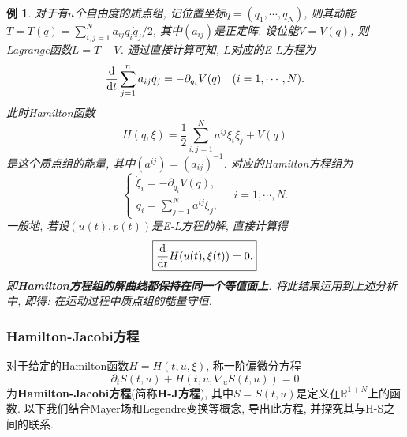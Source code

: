 \documentclass[12pt,a4paper]{article}
\newtheorem{example}[theorem]{例}
\begin{document}
\begin{example}
    对于有$n$个自由度的质点组, 记位置坐标$q = (q_1, \cdots, q_N)$, 则其动能$T = T(q) = \sum_{i, j = 1}^Na_{ij}\dot q_i\dot q_j/2$, 其中$(a_{ij})$是正定阵.
    设位能$V = V(q)$, 则Lagrange函数$L = T - V$. 通过直接计算可知, $L$对应的E-L方程为 
    \begin{equation*}
        \frac{{\rm d}}{{\rm d}t}\sum_{j = 1}^na_{ij}\dot q_j = -\partial_{q_i}V(q) \quad (i = 1, \cdots, N).
    \end{equation*}
    此时Hamilton函数 
    \begin{equation*}
        H(q, \xi) = \frac{1}{2}\sum_{i, j = 1}^Na^{ij}\xi_i\xi_j + V(q)
    \end{equation*}
    是这个质点组的能量, 其中$(a^{ij}) = (a_{ij})^{-1}$. 对应的Hamilton方程组为 
    \begin{equation*}
        \begin{cases} 
            \dot\xi_i = -\partial_{q_i}V(q), \\  
            \dot q_i = \sum_{j = 1}^Na^{ij}\xi_j,  
        \end{cases} 
        \quad i= 1, \cdots, N.
    \end{equation*}
    一般地, 若设$(u(t), p(t))$是E-L方程的解, 直接计算得 
    \begin{equation*}
        \boxed{\frac{{\rm d}}{{\rm d}t}H(u(t), \xi(t)) = 0.}
    \end{equation*}
    即\textbf{Hamilton方程组的解曲线都保持在同一个等值面上}. 将此结果运用到上述分析中, 即得: 在运动过程中质点组的能量守恒.
\end{example}

\subsubsection{Hamilton-Jacobi方程}

对于给定的Hamilton函数$H = H(t, u, \xi)$, 称一阶偏微分方程 
\begin{equation*}
    \boxed{\partial_tS(t, u) + H(t, u, \nabla_uS(t, u)) = 0}
\end{equation*}
为\textbf{Hamilton-Jacobi方程}(简称\textbf{H-J方程}), 其中$S = S(t, u)$是定义在$\mathbb{R}^{1 + N}$上的函数.
以下我们结合Mayer场和Legendre变换等概念, 导出此方程, 并探究其与H-S之间的联系.
\end{document}
